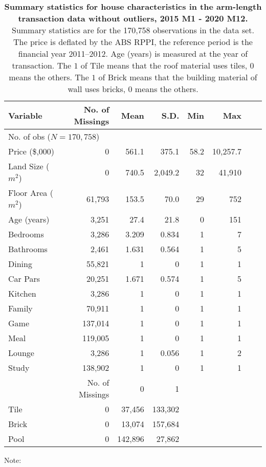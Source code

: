 \begin{table}[ht]
\centering
\caption{{\bf Summary statistics for house characteristics in the arm-length transaction data without outliers, 2015 M1 - 2020 M12.} Summary statistics are for the 170,758 observations in the data set. The price is deflated by the ABS RPPI, the reference period is the financial year 2011--2012. Age (years) is measured at the year of transaction. The $1$ of Tile means that the roof material uses tiles, $0$ means the others. The $1$ of Brick means that the building material of wall uses bricks, $0$ means the others.\setlength{\baselineskip}{1.25em}}
\label{tab_summary_stats_variables_withoutoutliers}
\setlength{\baselineskip}{0.75em}
\begin{threeparttable}\small
\begin{tabular}{lrrrrrrr}
\toprule\toprule
Variable           &No. of Missings &Mean   &S.D.    &Min  &Max\\
\midrule
\multicolumn{3}{l}{No. of obs ($N = 170,758$)}\\ 
Price (\$,000)     &0               &561.1  &375.1   &58.2 &10,257.7\\
Land Size ($m^2$)  &0               &740.5  &2,049.2 &32   &41,910\\
Floor Area ($m^2$) &61,793          &153.5  &70.0    &29   &752\\
Age (years)        &3,251           &27.4   &21.8    &0    &151\\
Bedrooms           &3,286           &3.209  &0.834   &1    &7\\
Bathrooms          &2,461           &1.631  &0.564   &1    &5\\
Dining             &55,821          &1      &0       &1    &1\\
Car Pars           &20,251          &1.671  &0.574   &1    &5\\
Kitchen            &3,286           &1      &0       &1    &1\\
Family             &70,911          &1      &0       &1    &1\\
Game               &137,014         &1      &0       &1    &1\\
Meal               &119,005         &1      &0       &1    &1\\
Lounge             &3,286           &1      &0.056   &1    &2\\
Study              &138,902         &1      &0       &1    &1\\
\midrule
                   &No. of Missings &0       &1\\
\midrule
Tile               &0               &37,456  &133,302\\
Brick              &0               &13,074  &157,684\\
Pool               &0               &142,896 &27,862\\
\bottomrule\bottomrule
\end{tabular}
Note:\setlength{\baselineskip}{1.25em}
\end{threeparttable}
\end{table}